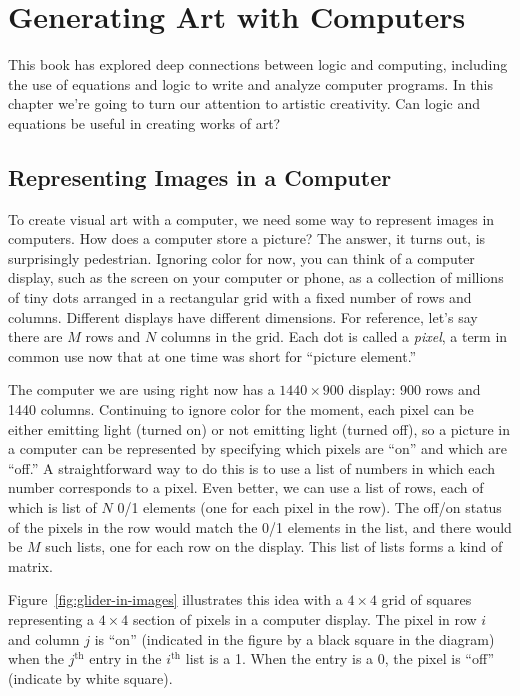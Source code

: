 \chapter{Generating Art with Computers}
\label{ch:art-computers}

This book has explored deep connections between logic
and computing, including the use of equations and logic to
write and analyze computer programs. In this chapter we're going
to turn our attention to artistic creativity. Can logic and
equations be useful in creating works of art?

\section{Representing Images in a Computer}

To create visual art with a computer, we need some way to
represent images in computers. How does a computer
store a picture?
The answer, it turns out, is surprisingly pedestrian. Ignoring
color for now, you can think of a computer display, such as the
screen on your computer or phone, as a collection of millions
of tiny dots arranged in a rectangular grid with a fixed number
of rows and columns. Different displays have different dimensions.
For reference, let's say there are $M$ rows and $N$ columns
in the grid.
Each dot is called a \emph{pixel}, a term in common use now
that at one time was short for ``picture element.''

The computer we are using right now has
a $1440\times900$ display: 900 rows and 1440 columns.
Continuing to ignore color for the moment, each pixel can
be either emitting light (turned on) or not emitting light
(turned off), so a picture in a computer can be represented
by specifying which pixels are ``on'' and which
are ``off.'' A straightforward way to do this is to use a list of
numbers in which each number corresponds to a pixel. Even better,
we can use a list of rows, each of which is list of $N$
0/1 elements (one for each pixel in the row).
The off/on status of the pixels in the row would
match the 0/1 elements in the list,
and there would be $M$ such lists, one for each row on the display.
This list of lists forms a kind of matrix.

Figure~\ref{fig:glider-in-images} illustrates
this idea with a $4\times4$ grid of squares
representing a $4\times4$ section of pixels in a computer display.
The pixel in row $i$ and column $j$ is ``on''
(indicated in the figure by a black square in the diagram)
when the $j^\text{th}$
entry in the $i^\text{th}$ list is a 1.
When the entry is a 0, the pixel is ``off'' (indicate by white square).

